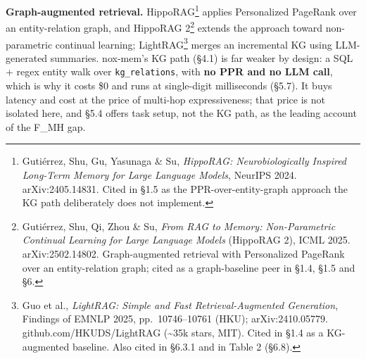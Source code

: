 \documentclass[
]{article}
\begin{document}
\textbf{Graph-augmented retrieval.} HippoRAG\footnote{Gutiérrez, Shu,
  Gu, Yasunaga \& Su, \emph{HippoRAG: Neurobiologically Inspired
  Long-Term Memory for Large Language Models}, NeurIPS 2024.
  arXiv:2405.14831. Cited in §1.5 as the PPR-over-entity-graph approach
  the KG path deliberately does not implement.} applies Personalized
PageRank over an entity-relation graph, and HippoRAG 2\footnote{Gutiérrez,
  Shu, Qi, Zhou \& Su, \emph{From RAG to Memory: Non-Parametric
  Continual Learning for Large Language Models} (HippoRAG 2), ICML 2025.
  arXiv:2502.14802. Graph-augmented retrieval with Personalized PageRank
  over an entity-relation graph; cited as a graph-baseline peer in §1.4,
  §1.5 and §6.} extends the approach toward non-parametric continual
learning; LightRAG\footnote{Guo et al., \emph{LightRAG: Simple and Fast
  Retrieval-Augmented Generation}, Findings of EMNLP 2025,
  pp.~10746--10761 (HKU); arXiv:2410.05779. github.com/HKUDS/LightRAG
  (\textasciitilde35k stars, MIT). Cited in §1.4 as a KG-augmented
  baseline. Also cited in §6.3.1 and in Table 2 (§6.8).} merges an
incremental KG using LLM-generated summaries. nox-mem's KG path (§4.1)
is far weaker by design: a SQL + regex entity walk over
\texttt{kg\_relations}, with \textbf{no PPR and no LLM call}, which is
why it costs \$0 and runs at single-digit milliseconds (§5.7). It buys
latency and cost at the price of multi-hop expressiveness; that price is
not isolated here, and §5.4 offers task setup, not the KG path, as the
leading account of the F\_MH gap.
\end{document}
